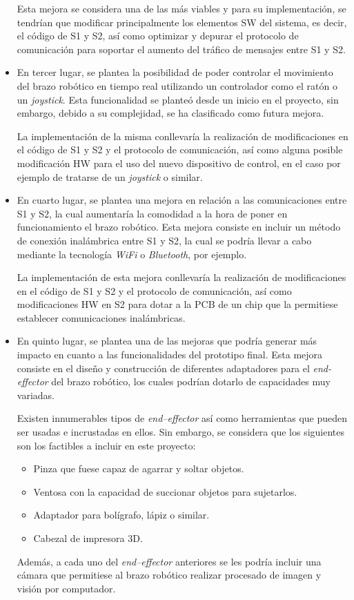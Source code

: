 \begin{itemize}
    Esta mejora se considera una de las más viables y para su implementación, se tendrían que modificar principalmente los elementos \ac{SW} del sistema, es decir, el código de \ac{S1} y \ac{S2}, así como optimizar y depurar el protocolo de comunicación para soportar el aumento del tráfico de mensajes entre \ac{S1} y \ac{S2}.
    
    \item En tercer lugar, se plantea la posibilidad de poder controlar el movimiento del brazo robótico en tiempo real utilizando un controlador como el ratón o un \textit{joystick}. Esta funcionalidad se planteó desde un inicio en el proyecto, sin embargo, debido a su complejidad, se ha clasificado como futura mejora.
    
    La implementación de la misma conllevaría la realización de modificaciones en el código de \ac{S1} y \ac{S2} y el protocolo de comunicación, así como alguna posible modificación \ac{HW} para el uso del nuevo dispositivo de control, en el caso por ejemplo de tratarse de un \textit{joystick} o similar.
    
    \item En cuarto lugar, se plantea una mejora en relación a las comunicaciones entre \ac{S1} y \ac{S2}, la cual aumentaría la comodidad a la hora de poner en funcionamiento el brazo robótico. Esta mejora consiste en incluir un método de conexión inalámbrica entre \ac{S1} y \ac{S2}, la cual se podría llevar a cabo mediante la tecnología \textit{WiFi} o \textit{Bluetooth}, por ejemplo.
    
    La implementación de esta mejora conllevaría la realización de modificaciones en el código de \ac{S1} y \ac{S2} y el protocolo de comunicación, así como modificaciones \ac{HW} en \ac{S2} para dotar a la PCB de un chip que la permitiese establecer comunicaciones inalámbricas.
    
    \item En quinto lugar, se plantea una de las mejoras que podría generar más impacto en cuanto a las funcionalidades del prototipo final. Esta mejora consiste en el diseño y construcción de diferentes adaptadores para el \textit{end-effector} del brazo robótico, los cuales podrían dotarlo de capacidades muy variadas.
    
    Existen innumerables tipos de \textit{end--effector} así como herramientas que pueden ser usadas e incrustadas en ellos. Sin embargo, se considera que los siguientes son los factibles a incluir en este proyecto:
    \begin{itemize}
        \item Pinza que fuese capaz de agarrar y soltar objetos.
        \item Ventosa con la capacidad de succionar objetos para sujetarlos.
        \item Adaptador para bolígrafo, lápiz o similar.
        \item Cabezal de impresora 3D.
    \end{itemize}
    Además, a cada uno del \textit{end--effector} anteriores se les podría incluir una cámara que permitiese al brazo robótico realizar procesado de imagen y visión por computador.
    

\end{itemize}
